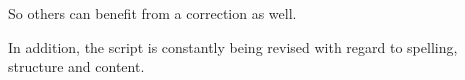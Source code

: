 \documentclass[headtopline=0.08em,headsepline=0.04em, bindingoffset = 5mm]{scrbook}
\numberwithin{equation}{chapter} %
\begin{document}
 So others can benefit from a correction as well.

In addition, the script is constantly being revised with regard to spelling, structure and content.


%
%
%
%
%
%
%
%

\listoffigures
\end{document}
